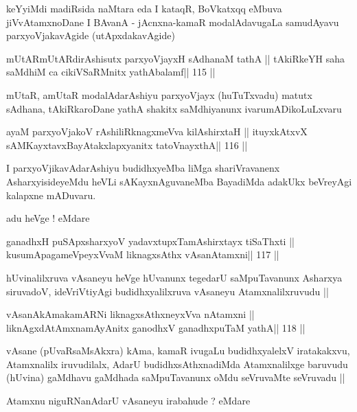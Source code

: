 \begin{artha}
keYyiMdi madiRsida naMtara eda I kataqR, BoVkatxqq eMbuva
jiVvAtamxnoDane I BAvanA - jAcnxna-kamaR modalAdavugaLa samudAyavu
parxyoVjakavAgide (utApxdakavAgide)
\end{artha}

\begin{shl}
mUtARmUtARdirAshisutx parxyoVjayxH sAdhanaM tathA ||
tAkiRkeYH saha saMdhiM ca cikiVSaRMnitx yathAbalamf\hfill || 115 ||
\end{shl}

\begin{artha}
mUtaR, amUtaR modalAdarAshiyu parxyoVjayx (huTuTxvadu) matutx sAdhana,
tAkiRkaroDane yathA shakitx saMdhiyanunx ivarumADikoLuLxvaru 
\end{artha}

\begin{shl}
ayaM parxyoVjakoV rAshiliRknagxmeVva kilA\s\s shirxtaH ||
ituyxkAtxvX sAMKayxtavxBayAtakxlapxyanitx tatoV\s nayxthA\hfill || 116 ||
\end{shl}

\begin{artha}
I parxyoVjikavAdarAshiyu budidhxyeMba liMga shariVravanenx
AsharxyisideyeMdu heVLi sAKayxnAguvaneMba BayadiMda adakUkx beVreyAgi
kalapxne mADuvaru.

adu heVge ! eMdare
\end{artha}

\begin{shl}
ganadhxH puSApxsharxyoV yadavxtupxTamAshirxtayx tiSaThxti ||
kusumApagameV\s peyxVvaM liknagxsAthx vAsanA\s\s tamxni\hfill || 117 ||
\end{shl}

\begin{artha}
hUvinalilxruva vAsaneyu heVge hUvanunx tegedarU saMpuTavanunx Asharxya
siruvadoV, ideVriVtiyAgi budidhxyalilxruva vAsaneyu Atamxnalilxruvudu ||
\end{artha}

\begin{shl}
vAsanAkAmakamARNi liknagxsAthxneyxVva nA\s\s tamxni ||
liknAgxdAtAmxnamAyAnitx ganodhxV ganadhxpuTaM yathA\hfill || 118 ||
\end{shl}

\begin{artha}
vAsane (pUvaRsaMsAkxra) kAma, kamaR ivugaLu budidhxyalelxV
iratakakxvu, Atamxnalilx iruvudilalx, AdarU budidhxsAthxnadiMda
Atamxnalilxge baruvudu (hUvina) gaMdhavu gaMdhada saMpuTavanunx oMdu
seVruvaMte seVruvadu ||

Atamxnu niguRNanAdarU vAsaneyu irabahude ? eMdare
\end{artha}

